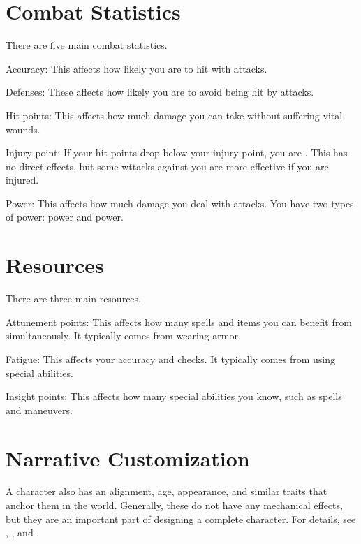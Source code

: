\section{Combat Statistics}\label{Combat Statistics}
  There are five main combat statistics.
  \begin{raggeditemize}
    \item Accuracy: This affects how likely you are to hit with attacks.
    \item Defenses: These affects how likely you are to avoid being hit by attacks.
    \item Hit points: This affects how much damage you can take without suffering vital wounds.
    \item Injury point: If your hit points drop below your injury point, you are .
      This has no direct effects, but some wttacks against you are more effective if you are injured.
    \item Power: This affects how much damage you deal with attacks.
      You have two types of power: \magical power and  power.
  \end{raggeditemize}

\section{Resources}
  There are three main resources.
  \begin{raggeditemize}
    \item Attunement points: This affects how many spells and items you can benefit from simultaneously.
      It typically comes from wearing armor.
    \item Fatigue: This affects your accuracy and checks.
      It typically comes from using special abilities.
    \item Insight points: This affects how many special abilities you know, such as spells and maneuvers.
  \end{raggeditemize}

\section{Narrative Customization}
  A character also has an alignment, age, appearance, and similar traits that anchor them in the world.
  Generally, these do not have any mechanical effects, but they are an important part of designing a complete character.
  For details, see , , and .


